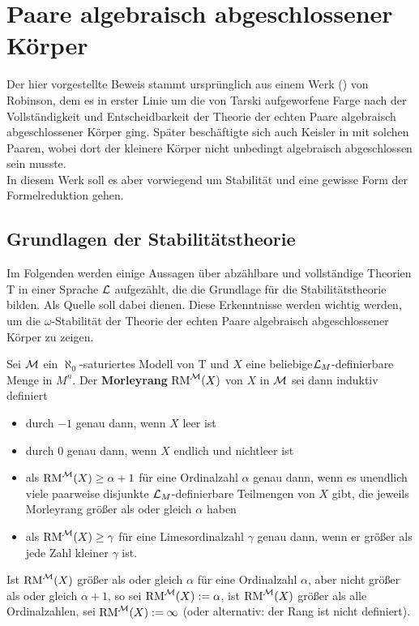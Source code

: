 	\chapter{Paare algebraisch abgeschlossener Körper}
	Der hier vorgestellte Beweis stammt ursprünglich aus einem Werk (\cite{Robinson}) von Robinson, dem es in erster Linie um die von Tarski aufgeworfene Farge nach der Vollständigkeit und Entscheidbarkeit der Theorie der echten Paare algebraisch abgeschlossener Körper ging. Später beschäftigte sich auch Keisler in \cite{Keisler} mit solchen Paaren, wobei dort der kleinere Körper nicht unbedingt algebraisch abgeschlossen sein musste.\\
	In diesem Werk soll es aber vorwiegend um Stabilität und eine gewisse Form der Formelreduktion gehen.
	
	\section{Grundlagen der Stabilitätstheorie}
	Im Folgenden werden einige Aussagen über abzählbare und vollständige Theorien T in einer Sprache $\mathcal{L}$ aufgezählt, die die Grundlage für die Stabilitätstheorie bilden. Als Quelle soll dabei \cite{Marker} dienen. Diese Erkenntnisse werden wichtig werden, um die $\omega$-Stabilität der Theorie der echten Paare algebraisch abgeschlossener Körper zu zeigen.
	
	\begin{definition}
		Sei $\mathcal{M}$ ein $\aleph_0$-saturiertes Modell von T und $X$ eine beliebige\linebreak $\mathcal{L}_M$-definierbare Menge in $M^n$. Der \textbf{Morleyrang} $\operatorname{RM}^{\mathcal{M}}(X)$ von $X$ in $\mathcal{M}$ sei dann induktiv definiert
		\begin{itemize}
			\item durch $-1$ genau dann, wenn $X$ leer ist
			\item durch $0$ genau dann, wenn $X$ endlich und nichtleer ist
			\item als $\operatorname{RM}^{\mathcal{M}}(X)\geq\alpha+1$ für eine Ordinalzahl $\alpha$ genau dann, wenn es unendlich viele paarweise disjunkte $\mathcal{L}_M$-definierbare Teilmengen von $X$ gibt, die jeweils Morleyrang größer als oder gleich $\alpha$ haben
			\item als $\operatorname{RM}^{\mathcal{M}}(X)\geq\gamma$ für eine Limesordinalzahl $\gamma$ genau dann, wenn er größer als jede Zahl kleiner $\gamma$ ist.
		\end{itemize}
	    Ist $\operatorname{RM}^{\mathcal{M}}(X)$ größer als oder gleich $\alpha$ für eine Ordinalzahl $\alpha$, aber nicht größer als oder gleich $\alpha+1$, so sei $\operatorname{RM}^{\mathcal{M}}(X):=\alpha$, ist $\operatorname{RM}^{\mathcal{M}}(X)$ größer als alle Ordinalzahlen, sei $\operatorname{RM}^{\mathcal{M}}(X):=\infty$ (oder alternativ: der Rang ist nicht definiert).
	\end{definition}
	
